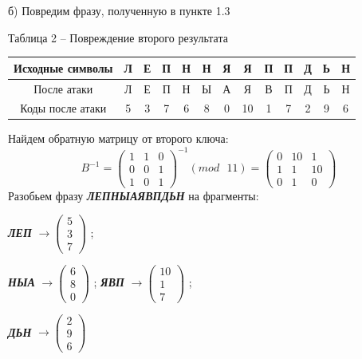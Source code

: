 \documentclass[a5paper, 10pt]{article}
\theoremstyle{definition}
\theoremstyle{plain}
\theoremstyle{remark}
\begin{document}
 б) Повредим фразу, полученную в пункте 1.3
\begin{center}
Таблица 2 -- Повреждение  второго результата\\
\begin{tabular}{ |c|c|c|c|c|c|c|c|c|c|c|c|c| } 
 \hline
Исходные символы & Л & Е & П & Н & Н  & Я & Я  & П & П  & Д & Ь  & Н\\
\hline
После атаки & Л & Е & П & Н & Ы  & А & Я  & В & П  & Д & Ь  & Н\\
 \hline
Коды после атаки & 5 & 3 & 7 & 6 & 8  & 0 & 10  & 1 & 7  & 2 & 9  & 6  \\
 \hline
\end{tabular}
\end{center}
Найдем обратную матрицу от второго ключа:
\begin{equation}
B^{-1} = 
\begin{pmatrix}
  1 & 1 & 0 \\
0 & 0 & 1\\
1 & 0 & 1
\end{pmatrix}^{-1} (mod \text{ }11)
 = 
\begin{pmatrix}
 0 & 10 & 1 \\
1 & 1 & 10\\
0 & 1 & 0
\end{pmatrix}
\end{equation}
Разобьем фразу  \textbf{\textit{ЛЕПНЫАЯВПДЬН}} на фрагменты:
\begin{center}
\textbf{\textit{ЛЕП}} $\to \begin{pmatrix}
 5\\
3\\
7
\end{pmatrix}$ ;

\textbf{\textit{НЫА}}  $\to \begin{pmatrix}
6\\
8\\
0
\end{pmatrix}$ ;
\textbf{\textit{ЯВП}}  $\to \begin{pmatrix}
 10\\
1\\
7
\end{pmatrix}$ ;

\textbf{\textit{ДЬН}}  $\to \begin{pmatrix}
2\\
9\\
6
\end{pmatrix}$ \\
\end{center}
\end{document}
